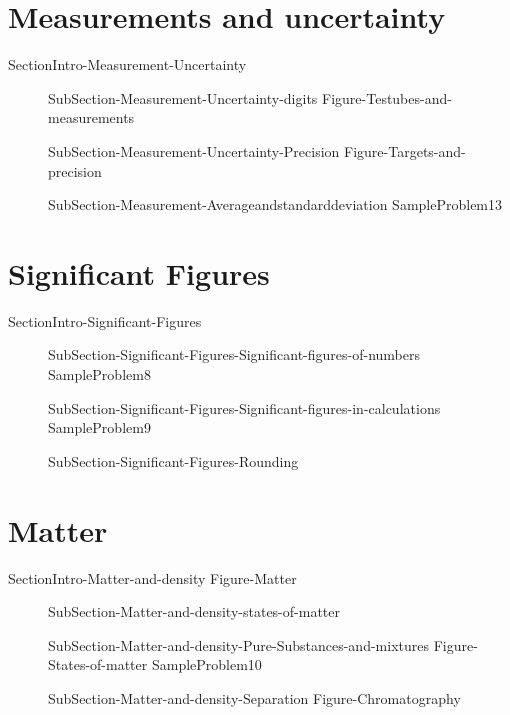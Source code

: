 \documentclass[main.tex]{subfiles}
\newcommand\chapterlabel{Ch-measurements}\setcounter{figurenewcounter}{0}\setcounter{tablenewcounter}{0}\setcounter{formulanewcounter}{0}\chapterpicture{../{\chapterlabel}/figure1}\chapterpicturelabel{PngImg}
\begin{document}
\section{Measurements and uncertainty}
{SectionIntro-Measurement-Uncertainty}
\sloppy\begin{description}
\item[]{SubSection-Measurement-Uncertainty-digits}
{Figure-Testubes-and-measurements}		
 \item[]{SubSection-Measurement-Uncertainty-Precision}
{Figure-Targets-and-precision}		
 \item[]{SubSection-Measurement-Averageandstandarddeviation}
 {SampleProblem13}
\end{description}

\section{Significant Figures}
{SectionIntro-Significant-Figures}
\sloppy\begin{description}
\item[]{SubSection-Significant-Figures-Significant-figures-of-numbers}
{SampleProblem8}
\item[]{SubSection-Significant-Figures-Significant-figures-in-calculations}
{SampleProblem9}
 \item[]{SubSection-Significant-Figures-Rounding}
\end{description}

 
\section{Matter}
{SectionIntro-Matter-and-density}
{Figure-Matter}		
\sloppy\begin{description}
\item[] {SubSection-Matter-and-density-states-of-matter}
\item[]{SubSection-Matter-and-density-Pure-Substances-and-mixtures}
{Figure-States-of-matter}
{SampleProblem10}
\item[]{SubSection-Matter-and-density-Separation}
{Figure-Chromatography}		
\end{description}
\end{document}
